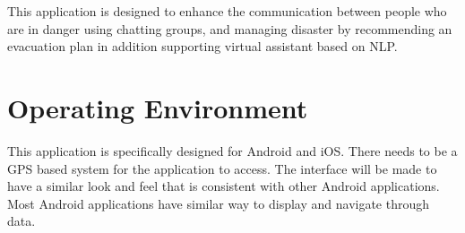 \documentclass{scrreprt}
\begin{document}
This application is designed to enhance the communication between people who are in danger using chatting groups, and managing disaster by recommending an evacuation plan in addition supporting virtual assistant based on NLP.



\section{Operating Environment}

This application is specifically designed for Android and iOS. There needs to be a GPS based system for the application to access. The interface will be made to have a similar look and feel that is consistent with other Android applications. Most Android applications have similar way to display and navigate through data.


\end{document}
